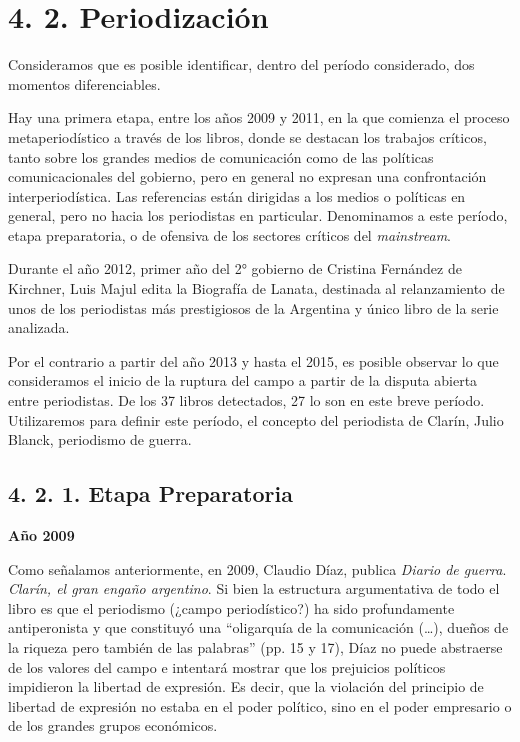 \section{4. 2. Periodización}

Consideramos que es posible identificar, dentro del período considerado, dos momentos diferenciables.

Hay una primera etapa, entre los años 2009 y 2011, en la que comienza el proceso metaperiodístico a través de los libros, donde se destacan los trabajos críticos, tanto sobre los grandes medios de comunicación como de las políticas comunicacionales del gobierno, pero en general no expresan una confrontación interperiodística. Las referencias están dirigidas a los medios o políticas en general, pero no hacia los periodistas en particular. Denominamos a este período, etapa preparatoria, o de ofensiva de los sectores críticos del \emph{mainstream}.

Durante el año 2012, primer año del 2° gobierno de Cristina Fernández de Kirchner, Luis Majul edita la Biografía de Lanata, destinada al relanzamiento de unos de los periodistas más prestigiosos de la Argentina y único libro de la serie analizada.

Por el contrario a partir del año 2013 y hasta el 2015, es posible observar lo que consideramos el inicio de la ruptura del campo a partir de la disputa abierta entre periodistas. De los 37 libros detectados, 27 lo son en este breve período. Utilizaremos para definir este período, el concepto del periodista de Clarín, Julio Blanck, periodismo de guerra.


\subsection{4. 2. 1. Etapa Preparatoria}

\textbf{Año 2009}

Como señalamos anteriormente, en 2009, Claudio Díaz, publica \emph{Diario de guerra}. \emph{Clarín, el gran engaño argentino}. Si bien la estructura argumentativa de todo el libro es que el periodismo (¿campo periodístico?) ha sido profundamente antiperonista y que constituyó una ``oligarquía de la comunicación (\ldots), dueños de la riqueza pero también de las palabras'' (pp. 15 y 17), Díaz no puede abstraerse de los valores del campo e intentará mostrar que los prejuicios políticos impidieron la libertad de expresión. Es decir, que la violación del principio de libertad de expresión no estaba en el poder político, sino en el poder empresario o de los grandes grupos económicos.

